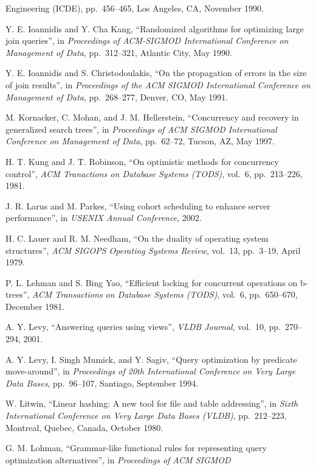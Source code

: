 \documentclass[b5paper,11pt,twoside,openright]{book}
\begin{document}
\begin{enumerate}[label={[\arabic*]}]
{  Engineering (ICDE)}, pp.~456--465, Los Angeles, CA, November 1990.
\item
  Y. E. Ioannidis and Y. Cha Kang, ``Randomized algorithms for
  optimizing large join queries'', in \emph{Proceedings of ACM-SIGMOD
  International Conference} \emph{on Management of Data}, pp.~312--321,
  Atlantic City, May 1990.
\item
  Y. E. Ioannidis and S. Christodoulakis, ``On the propagation of errors
  in the size of join results'', in \emph{Proceedings of the ACM SIGMOD
  International Conference} \emph{on Management of Data}, pp.~268--277,
  Denver, CO, May 1991.
\item
  M. Kornacker, C. Mohan, and J. M. Hellerstein, ``Concurrency and
  recovery in generalized search trees'', in \emph{Proceedings of ACM
  SIGMOD International} \emph{Conference on Management of Data},
  pp.~62--72, Tucson, AZ, May 1997.
\item
  H. T. Kung and J. T. Robinson, ``On optimistic methods for concurrency
  control'', \emph{ACM Tranactions on Database Systems (TODS)}, vol.~6,
  pp.~213--226, 1981.
\item
  J. R. Larus and M. Parkes, ``Using cohort scheduling to enhance server
  performance'', in \emph{USENIX Annual Conference}, 2002.
\item
  H. C. Lauer and R. M. Needham, ``On the duality of operating system
  structures'', \emph{ACM SIGOPS Operating Systems Review}, vol.~13,
  pp.~3--19, April 1979.
\item
  P. L. Lehman and S. Bing Yao, ``Efficient locking for concurrent
  operations on b-trees'', \emph{ACM Transactions on Database Systems
  (TODS)}, vol.~6, pp.~650--670, December 1981.
\item
  A. Y. Levy, ``Answering queries using views'', \emph{VLDB Journal},
  vol.~10, pp.~270-- 294, 2001.
\item
  A. Y. Levy, I. Singh Mumick, and Y. Sagiv, ``Query optimization by
  predicate move-around'', in \emph{Proceedings of 20th International
  Conference on Very Large} \emph{Data Bases}, pp.~96--107, Santiago,
  September 1994.
\item
  W. Litwin, ``Linear hashing: A new tool for file and table
  addressing'', in \emph{Sixth} \emph{International Conference on Very
  Large Data Bases (VLDB)}, pp.~212--223, Montreal, Quebec, Canada,
  October 1980.
\item
  G. M. Lohman, ``Grammar-like functional rules for representing query
  optimization alternatives'', in \emph{Proceedings of ACM SIGMOD
}
\end{enumerate}
\end{document}
